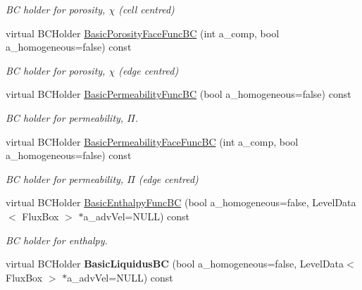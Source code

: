 \begin{DoxyCompactItemize}
\begin{DoxyCompactList}\small\item\em B\-C holder for porosity, $ \chi $ (cell centred) \end{DoxyCompactList}\item 
\hypertarget{class_phys_b_c_util_a3d1deac59d469738b4cec7d61073510f}{virtual B\-C\-Holder \hyperlink{class_phys_b_c_util_a3d1deac59d469738b4cec7d61073510f}{Basic\-Porosity\-Face\-Func\-B\-C} (int a\-\_\-comp, bool a\-\_\-homogeneous=false) const }\label{class_phys_b_c_util_a3d1deac59d469738b4cec7d61073510f}

\begin{DoxyCompactList}\small\item\em B\-C holder for porosity, $ \chi $ (edge centred) \end{DoxyCompactList}\item 
\hypertarget{class_phys_b_c_util_a7af8441b5551c0105a88322d25659b1d}{virtual B\-C\-Holder \hyperlink{class_phys_b_c_util_a7af8441b5551c0105a88322d25659b1d}{Basic\-Permeability\-Func\-B\-C} (bool a\-\_\-homogeneous=false) const }\label{class_phys_b_c_util_a7af8441b5551c0105a88322d25659b1d}

\begin{DoxyCompactList}\small\item\em B\-C holder for permeability, $ \Pi $. \end{DoxyCompactList}\item 
\hypertarget{class_phys_b_c_util_ad78db7cfa2a4e13121c21eff7c52d8fe}{virtual B\-C\-Holder \hyperlink{class_phys_b_c_util_ad78db7cfa2a4e13121c21eff7c52d8fe}{Basic\-Permeability\-Face\-Func\-B\-C} (int a\-\_\-comp, bool a\-\_\-homogeneous=false) const }\label{class_phys_b_c_util_ad78db7cfa2a4e13121c21eff7c52d8fe}

\begin{DoxyCompactList}\small\item\em B\-C holder for permeability, $ \Pi $ (edge centred) \end{DoxyCompactList}\item 
\hypertarget{class_phys_b_c_util_a2e644dedf1a1af8ca706934373243b71}{virtual B\-C\-Holder \hyperlink{class_phys_b_c_util_a2e644dedf1a1af8ca706934373243b71}{Basic\-Enthalpy\-Func\-B\-C} (bool a\-\_\-homogeneous=false, Level\-Data$<$ Flux\-Box $>$ $\ast$a\-\_\-adv\-Vel=N\-U\-L\-L) const }\label{class_phys_b_c_util_a2e644dedf1a1af8ca706934373243b71}

\begin{DoxyCompactList}\small\item\em B\-C holder for enthalpy. \end{DoxyCompactList}\item 
\hypertarget{class_phys_b_c_util_a176ee6a7c294b39ccf125396a9b8ae83}{virtual B\-C\-Holder {\bfseries Basic\-Liquidus\-B\-C} (bool a\-\_\-homogeneous=false, Level\-Data$<$ Flux\-Box $>$ $\ast$a\-\_\-adv\-Vel=N\-U\-L\-L) const }\label{class_phys_b_c_util_a176ee6a7c294b39ccf125396a9b8ae83}


\end{DoxyCompactItemize}

